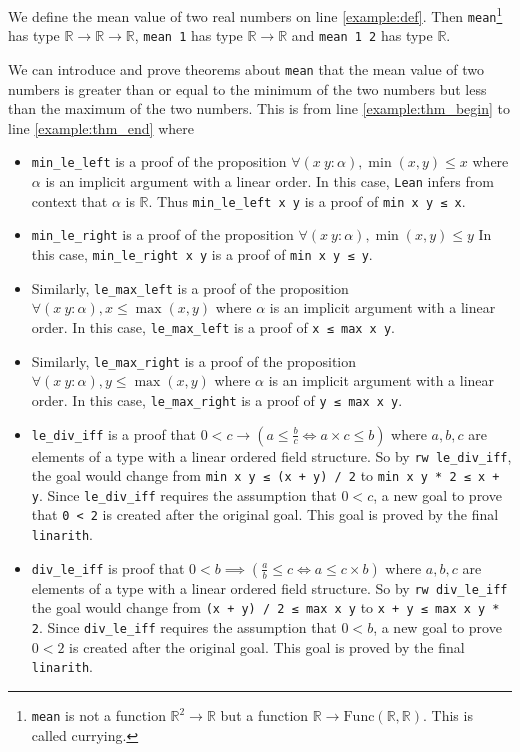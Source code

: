 \documentclass{report}
\theoremstyle{definition}
\theoremstyle{plain}
\begin{document}
We define the mean value of two real numbers on line \ref{example:def}. Then {\tt mean}\footnote{{\tt mean} is not a function $\mathbb R^2\to\mathbb R$ but a function $\mathbb R\to\mathrm{Func}(\mathbb R,\mathbb R)$. This is called currying.} has type $\mathbb R\to \mathbb R\to \mathbb R$, {\tt mean 1} has type $\mathbb R\to \mathbb R$ and {\tt mean 1 2} has type $\mathbb R$. 

We can introduce and prove theorems about {\tt mean} that the mean value of two numbers is greater than or equal to the minimum of the two numbers but less than the maximum of the two numbers. This is from line \ref{example:thm_begin} to line \ref{example:thm_end} where
\begin{itemize}
  \item {\tt min\_le\_left} is a proof of the proposition $\forall (x\ y : \alpha), \min(x, y) \le x$ where $\alpha$ is an implicit argument with a linear order. In this case, {\tt Lean} infers from context that $\alpha$ is $\mathbb R$. Thus {\tt min\_le\_left x y} is a proof of {\tt min x y ≤ x}.
  \item {\tt min\_le\_right} is a proof of the proposition $\forall (x\ y : \alpha), \min(x, y) \le y$ In this case, {\tt min\_le\_right x y} is a proof of {\tt min x y ≤ y}.
  \item Similarly, {\tt le\_max\_left} is a proof of the proposition $\forall (x\ y : \alpha), x \le \max(x, y)$ where $\alpha$ is an implicit argument with a linear order. In this case, {\tt le\_max\_left} is a proof of {\tt x ≤ max x y}.
  \item Similarly, {\tt le\_max\_right} is a proof of the proposition $\forall (x\ y : \alpha), y \le \max(x, y)$ where $\alpha$ is an implicit argument with a linear order. In this case, {\tt le\_max\_right} is a proof of {\tt y ≤ max x y}.
  \item {\tt le\_div\_iff} is a proof that $0 < c \to (a \le \frac{b}{c} \iff a\times c \le b)$ where $a,b,c$ are elements of a type with a linear ordered field structure. So by {\tt rw le\_div\_iff}, the goal would change from {\tt min x y ≤ (x + y) / 2} to {\tt min x y * 2 ≤ x + y}. Since {\tt le\_div\_iff} requires the assumption that $0<c$, a new goal to prove that {\tt 0 < 2} is created after the original goal. This goal is proved by the final {\tt linarith}.
  \item {\tt div\_le\_iff} is proof that $0 < b \implies (\frac a b \le c \iff a \le c \times b)$ where $a,b,c$ are elements of a type with a linear ordered field structure. So by {\tt rw div\_le\_iff} the goal would change from {\tt (x + y) / 2 ≤ max x y} to {\tt x + y ≤ max x y * 2}. Since {\tt div\_le\_iff} requires the assumption that $0 < b$, a new goal to prove $0 < 2$ is created after the original goal. This goal is proved by the final {\tt linarith}.

\end{itemize}
\end{document}
